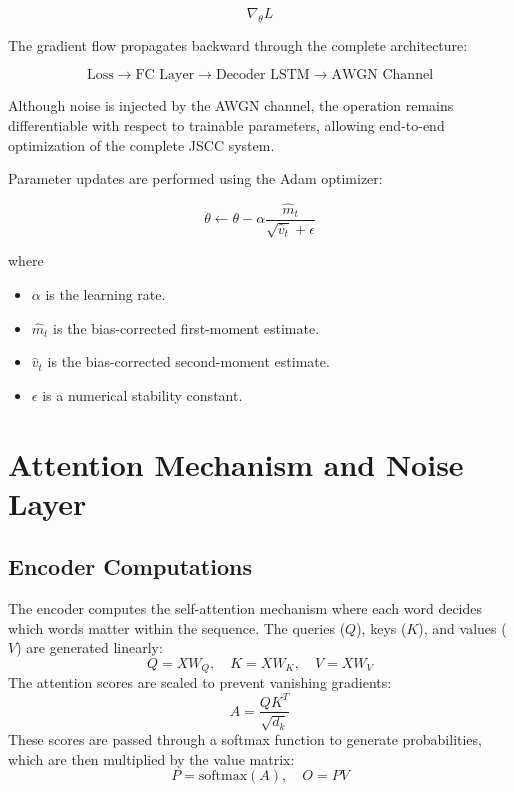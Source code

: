 \documentclass[twocolumn]{article}
\begin{document}
\begin{equation}
\nabla_{\theta}L
\end{equation}

The gradient flow propagates backward through the complete architecture:

\[
\text{Loss}
\rightarrow
\text{FC Layer}
\rightarrow
\text{Decoder LSTM}
\rightarrow
\text{AWGN Channel}

\]

Although noise is injected by the AWGN channel, the operation remains differentiable with respect to trainable parameters, allowing end-to-end optimization of the complete JSCC system.

Parameter updates are performed using the Adam optimizer:

\begin{equation}
\theta
\leftarrow
\theta
-
\alpha
\frac{\hat{m}_t}
{\sqrt{\hat{v}_t}+\epsilon}
\end{equation}

where

\begin{itemize}
    \item \(\alpha\) is the learning rate.
    \item \(\hat{m}_t\) is the bias-corrected first-moment estimate.
    \item \(\hat{v}_t\) is the bias-corrected second-moment estimate.
    \item \(\epsilon\) is a numerical stability constant.
\end{itemize}
\section{\large \textbf{Attention Mechanism and Noise Layer}}

\subsection{\textbf{Encoder Computations}}
The encoder computes the self-attention mechanism where each word decides which words matter within the sequence. The queries ($Q$), keys ($K$), and values ($V$) are generated linearly:
\begin{equation}
    Q = XW_Q, \quad K = XW_K, \quad V = XW_V
\end{equation}
The attention scores are scaled to prevent vanishing gradients:
\begin{equation}
    A = \frac{QK^T}{\sqrt{d_k}}
\end{equation}
These scores are passed through a softmax function to generate probabilities, which are then multiplied by the value matrix:
\begin{equation}
    P = \text{softmax}(A), \quad O = PV
\end{equation}
\end{document}
